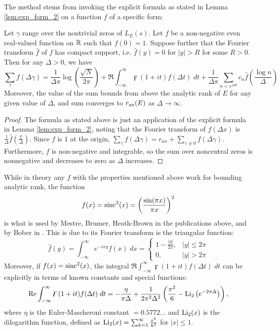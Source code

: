 The method stems from invoking the explicit formula as stated in Lemma \ref{lem:exp_form_2} on a function $f$ of a specific form:
\begin{lemma}\label{lem:exp_form_nonneg_f_cpt_suppt}
Let $\gamma$ range over the nontrivial zeros of $L_E(s)$. Let $f$ be a non-negative even real-valued function on $\mathbb{R}$ such that $f(0)=1$. Suppose further that the Fourier transform $\hat{f}$ of $f$ has compact support, i.e. $\hat{f}(y) = 0$ for $|y|>R$ for some $R>0$. Then for any $\Delta>0$, we have
\begin{equation}
\sum_{\gamma} f(\Delta \gamma) = \frac{1}{\Delta \pi}\log\left(\frac{\sqrt{N}}{2\pi}\right) + \Re\int_{-\infty}^{\infty} \digamma(1+it)f(\Delta t) \; dt  + \frac{1}{\Delta \pi}\sum_{n<e^{\Delta R}} c_n \hat{f}\left(\frac{\log n}{\Delta}\right)
\end{equation}
Moreover, the value of the sum bounds from above the analytic rank of $E$ for any given value of $\Delta$, and sum converges to $r_{{\rm an}}(E)$ as $\Delta \to \infty$.
\end{lemma}

\begin{proof}
The formula as stated above is just an application of the explicit formula in Lemma \ref{lem:exp_form_2}, noting that the Fourier transform of $f(\Delta x)$ is $\frac{1}{\Delta}\hat{f}\left(\frac{\xi}{\Delta}\right)$. Since $f$ is $1$ at the origin, $\sum_{\gamma} f(\Delta \gamma) = r_{an} + \sum_{\gamma\ne 0} f(\Delta \gamma)$. Furthermore, $f$ is non-negative and integrable, so the sum over noncentral zeros is nonnegative and decreases to zero as $\Delta$ increases.
\end{proof}

While in theory any $f$ with the properties mentioned above work for bounding analytic rank, the function
\begin{equation}
f(x) = \text{sinc}^2(x) = \left(\frac{\sin(\pi x)}{\pi x}\right)^2
\end{equation}
is what is used by Mestre, Brumer, Heath-Brown in the publications above, and by Bober in \cite{Bob-2011}. This is due to its Fourier transform is the triangular function:
\begin{equation}
\hat{f}(y) = \int_{-\infty}^{\infty} e^{-i x y}f(x)\; dx =  \begin{cases} 1 - \frac{|y|}{2\pi}, & |y|\le 2\pi \\ 0, & |y| > 2\pi\end{cases}
\end{equation}
Moreover, if $f(x) = \text{sinc}^2(x)$, the integral $\Re\int_{-\infty}^{\infty} \digamma(1+it)f(\Delta t) \; dt$ can be explicitly in terms of known constants and special functions:
\begin{equation}
\mbox{\rm Re}\int_{-\infty}^{\infty} \digamma(1+it)f(\Delta t) \; dt = - \frac{\eta}{\pi \Delta} + \frac{1}{2\pi^2 \Delta^2}\left(\frac{\pi^2}{6} - \text{Li}_2\left(e^{-2\pi \Delta}\right)\right),
\end{equation}
where $\eta$ is the Euler-Mascheroni constant $= 0.5772\ldots$ and $\text{Li}_2(x)$ is the dilogarithm function, defined as $\text{Li}_2(x) = \sum_{k=1}^{\infty} \frac{x^k}{k^2}$ for $|x|\le 1$.

